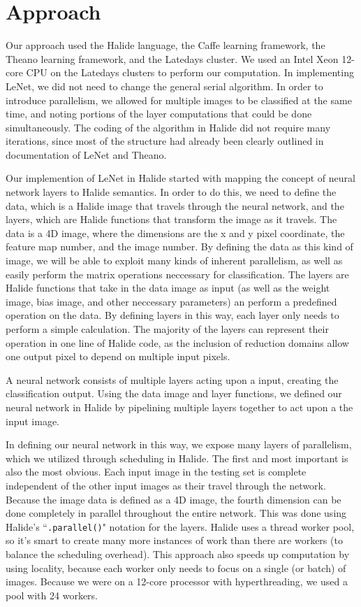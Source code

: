 \documentclass[11pt,twoside]{article}
\begin{document}
\section{Approach}

Our approach used the Halide language, the Caffe learning framework, the Theano learning framework, and the Latedays cluster.
We used an Intel Xeon 12-core CPU on the Latedays clusters to perform our computation.
In implementing LeNet, we did not need to change the general serial algorithm.
In order to introduce parallelism, we allowed for multiple images to be classified at the same time, and noting portions of the layer computations that could be done simultaneously.
The coding of the algorithm in Halide did not require many iterations, since most of the structure had already been clearly outlined in documentation of LeNet and Theano.

Our implemention of LeNet in Halide started with mapping the concept of neural network layers to Halide semantics.
In order to do this, we need to define the data, which is a Halide image that travels through the neural network, and the layers, which are Halide functions that transform the image as it travels.
The data is a 4D image, where the dimensions are the x and y pixel coordinate, the feature map number, and the image number.
By defining the data as this kind of image, we will be able to exploit many kinds of inherent parallelism, as well as easily perform the matrix operations neccessary for classification.
The layers are Halide functions that take in the data image as input (as well as the weight image, bias image, and other neccessary parameters) an perform a predefined operation on the data.
By defining layers in this way, each layer only needs to perform a simple calculation.
The majority of the layers can represent their operation in one line of Halide code, as the inclusion of reduction domains allow one output pixel to depend on multiple input pixels.

A neural network consists of multiple layers acting upon a input, creating the classification output.
Using the data image and layer functions, we defined our neural network in Halide by pipelining multiple layers together to act upon a the input image.

In defining our neural network in this way, we expose many layers of parallelism, which we utilized through scheduling in Halide.
The first and most important is also the most obvious.
Each input image in the testing set is complete independent of the other input images as their travel through the network.
Because the image data is defined as a 4D image, the fourth dimension can be done completely in parallel throughout the entire network.
This was done using Halide's ``\texttt{.parallel()}" notation for the layers.
Halide uses a thread worker pool, so it's smart to create many more instances of work than there are workers (to balance the scheduling overhead).
This approach also speeds up computation by using locality, because each worker only needs to focus on a single (or batch) of images.
Because we were on a 12-core processor with hyperthreading, we used a pool with 24 workers.
\end{document}
